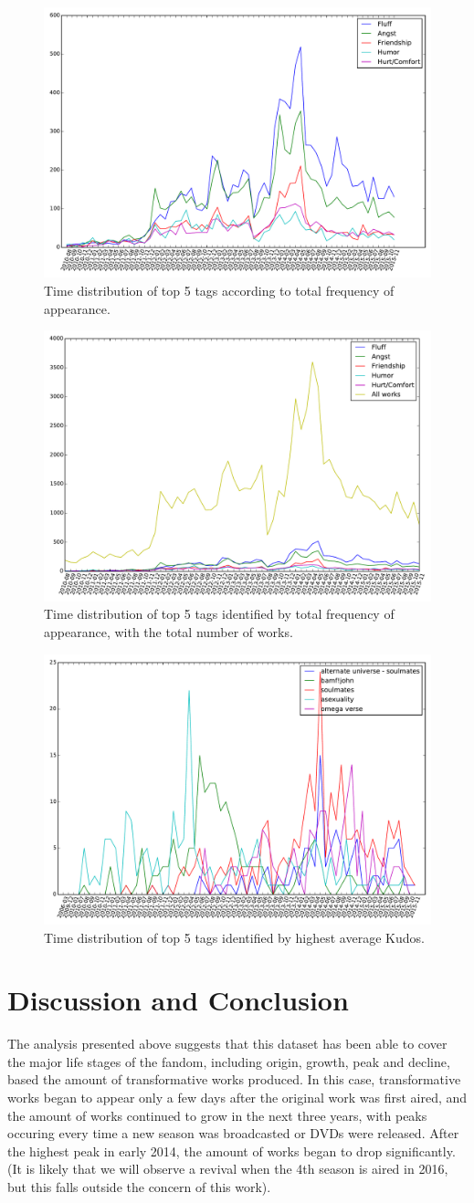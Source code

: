 \documentclass{pnastwo}
\begin{document}
\begin{article}
\begin{figure}
\centerline{\includegraphics[width=.4\textwidth]{top_frequency_tag_time.pdf}}
\caption{Time distribution of top 5 tags according to total frequency of appearance.}\label{freq_tag}
\end{figure}

\begin{figure}
\centerline{\includegraphics[width=.4\textwidth]{top_frequency_tag_time_w_total.pdf}}
\caption{Time distribution of top 5 tags identified by total frequency of appearance, with the total number of works.}\label{freq_tag_wtotal}
\end{figure}

\begin{figure}
\centerline{\includegraphics[width=.4\textwidth]{top_popularity_tag_time.pdf}}
\caption{Time distribution of top 5 tags identified by highest average Kudos.}\label{popular_tag}
\end{figure}

\section{Discussion and Conclusion}
The analysis presented above suggests that this dataset has been able to cover the major life stages of the fandom, including origin, growth, peak and decline, based the amount of transformative works produced. In this case, transformative works began to appear only a few days after the original work was first aired, and the amount of works continued to grow in the next three years, with peaks occuring every time a new season was broadcasted or DVDs were released. After the highest peak in early 2014, the amount of works began to drop significantly. (It is likely that we will observe a revival when the 4th season is aired in 2016, but this falls outside the concern of this work). 


\end{article}
\end{document}
